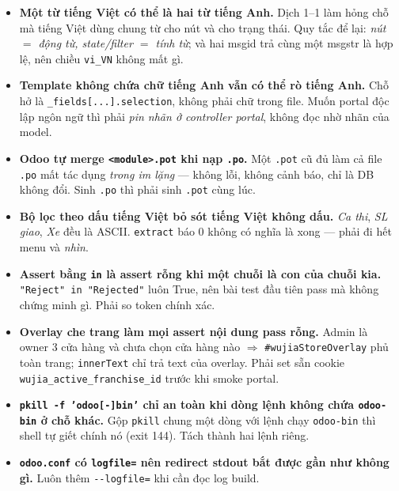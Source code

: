 \begin{itemize}
  \item \textbf{Một từ tiếng Việt có thể là hai từ tiếng Anh.} Dịch 1--1 làm hỏng chỗ mà tiếng Việt
    dùng chung từ cho nút và cho trạng thái. Quy tắc để lại: \emph{nút $=$ động từ, state/filter $=$
    tính từ}; và hai msgid trả cùng một msgstr là hợp lệ, nên chiều \texttt{vi\_VN} không mất gì.
  \item \textbf{Template không chứa chữ tiếng Anh vẫn có thể rò tiếng Anh.} Chỗ hở là
    \texttt{\_fields[...].selection}, không phải chữ trong file. Muốn portal độc lập ngôn ngữ thì
    phải \emph{pin nhãn ở controller portal}, không đọc nhờ nhãn của model.
  \item \textbf{Odoo tự merge \texttt{<module>.pot} khi nạp \texttt{.po}.} Một \texttt{.pot} cũ đủ
    làm cả file \texttt{.po} mất tác dụng \emph{trong im lặng} --- không lỗi, không cảnh báo, chỉ là
    DB không đổi. Sinh \texttt{.po} thì phải sinh \texttt{.pot} cùng lúc.
  \item \textbf{Bộ lọc theo dấu tiếng Việt bỏ sót tiếng Việt không dấu.} \emph{Ca thi}, \emph{SL
    giao}, \emph{Xe} đều là ASCII. \texttt{extract} báo 0 không có nghĩa là xong --- phải đi hết menu
    và \emph{nhìn}.
  \item \textbf{Assert bằng \texttt{in} là assert rỗng khi một chuỗi là con của chuỗi kia.}
    \texttt{"Reject" in "Rejected"} luôn True, nên bài test đầu tiên pass mà không chứng minh gì.
    Phải so token chính xác.
  \item \textbf{Overlay che trang làm mọi assert nội dung pass rỗng.} Admin là owner 3 cửa hàng và
    chưa chọn cửa hàng nào $\Rightarrow$ \texttt{\#wujiaStoreOverlay} phủ toàn trang;
    \texttt{innerText} chỉ trả text của overlay. Phải set sẵn cookie
    \texttt{wujia\_active\_franchise\_id} trước khi smoke portal.
  \item \textbf{\texttt{pkill -f 'odoo[-]bin'} chỉ an toàn khi dòng lệnh không chứa
    \texttt{odoo-bin} ở chỗ khác.} Gộp \texttt{pkill} chung một dòng với lệnh chạy
    \texttt{odoo-bin} thì shell tự giết chính nó (exit 144). Tách thành hai lệnh riêng.
  \item \textbf{\texttt{odoo.conf} có \texttt{logfile=} nên redirect stdout bắt được gần như không
    gì.} Luôn thêm \texttt{-{}-logfile=} khi cần đọc log build.
\end{itemize}

